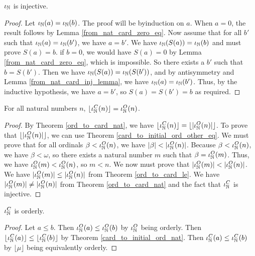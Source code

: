 \documentclass[../../math.tex]{subfiles}
\begin{document}
\begin{instance}
    $\iota_{\mathbb{N}}$ is injective.
\end{instance}
\begin{proof}
    Let $\iota_{\mathbb{N}}(a) = \iota_{\mathbb{N}}(b)$.  The proof will be byinduction on $a$.  When $a = 0$,
    the result follows by Lemma \ref{from_nat_card_zero_eq}.  Now assume that
    for all $b'$ such that $\iota_{\mathbb{N}}(a) = \iota_{\mathbb{N}}(b')$, we have $a = b'$.  We have
    $\iota_{\mathbb{N}}(S(a)) = \iota_{\mathbb{N}}(b)$ and must prove $S(a) = b$.  if $b = 0$, we would have
    $S(a) = 0$ by Lemma \ref{from_nat_card_zero_eq}, which is impossible.  So
    there exists a $b'$ such that $b = S(b')$.  Then we have $\iota_{\mathbb{N}}(S(a)) =
    \iota_{\mathbb{N}}(S(b'))$, and by antisymmetry and Lemma \ref{from_nat_card_inj_lemma}, we
    have $\iota_{\mathbb{N}}(a) = \iota_{\mathbb{N}}(b')$.  Thus, by the inductive hypothesis, we have $a =
    b'$, so $S(a) = S(b') = b$ as required.
\end{proof}

\begin{theorem} \label{card_to_initial_ord_nat}
    For all natural numbers $n$, $\lfloor \iota_{\mathbb{N}}^C(n) \rfloor = \iota_{\mathbb{N}}^O(n)$.
\end{theorem}
\begin{proof}
    By Theorem \ref{ord_to_card_nat}, we have $\lfloor \iota_{\mathbb{N}}^C(n) \rfloor =
    \lfloor | \iota_{\mathbb{N}}^O(n) | \rfloor$.  To prove that $\lfloor | \iota_{\mathbb{N}}^O(n) |
    \rfloor$, we can use Theorem \ref{card_to_initial_ord_other_eq}.  We must
    prove that for all ordinals $\beta < \iota_{\mathbb{N}}^O(n)$, we have $|\beta| <
    |\iota_{\mathbb{N}}^O(n)|$.  Because $\beta < \iota_{\mathbb{N}}^O(n)$, we have $\beta < \omega$, so there
    exists a natural number $m$ such that $\beta = \iota_{\mathbb{N}}^O(m)$.  Thus, we have
    $\iota_{\mathbb{N}}^O(m) < \iota_{\mathbb{N}}^O(n)$, so $m < n$.  We now must prove that $|\iota_{\mathbb{N}}^O(m)| <
    |\iota_{\mathbb{N}}^O(n)|$.  We have $|\iota_{\mathbb{N}}^O(m)| \leq |\iota_{\mathbb{N}}^O(n)|$ from Theorem
    \ref{ord_to_card_le}.  We have $|\iota_{\mathbb{N}}^O(m)| \neq |\iota_{\mathbb{N}}^O(n)|$ from Theorem
    \ref{ord_to_card_nat} and the fact that $\iota_{\mathbb{N}}^C$ is injective.
\end{proof}

\begin{instance}
    $\iota_{\mathbb{N}}^C$ is orderly.
\end{instance}
\begin{proof}
    Let $a \leq b$.  Then $\iota_{\mathbb{N}}^O(a) \leq \iota_{\mathbb{N}}^O(b)$ by $\iota_{\mathbb{N}}^O$ being orderly.
    Then $\lfloor \iota_{\mathbb{N}}^C(a) \rfloor \leq \lfloor \iota_{\mathbb{N}}^C(b) \rfloor$ by Theorem
    \ref{card_to_initial_ord_nat}.  Then $\iota_{\mathbb{N}}^C(a) \leq \iota_{\mathbb{N}}^C(b)$ by $\lfloor
    \mu \rfloor$ being equivalently orderly.
\end{proof}
\end{document}
